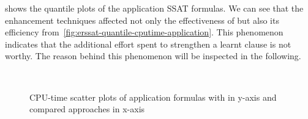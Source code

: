  shows the quantile plots of the application SSAT formulas.
We can see that the enhancement techniques affected not only the effectiveness of \erssat but also its efficiency
from~\cref{fig:erssat-quantile-cputime-application}.
This phenomenon indicates that the additional effort spent to strengthen a learnt clause is not worthy.
The reason behind this phenomenon will be inspected in the following.

\begin{figure}[hp]
    \centering
    \\
    \caption{CPU-time scatter plots of application formulas with \erssat in y-axis and compared approaches in x-axis}
    \label{fig:erssat-scatter-application}
\end{figure}

